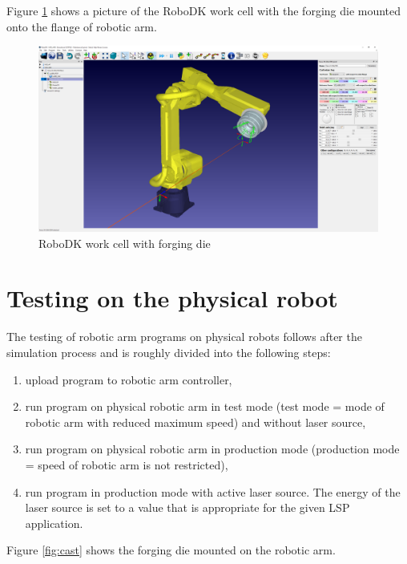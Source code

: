 Figure \ref{fig:robodk_die} shows a picture of the RoboDK work cell with the forging die mounted onto the flange of robotic arm.

\begin{figure}[h]
    \centering
    \includegraphics[width=1.0\linewidth]{img/robodk_cast.PNG}
    \caption{RoboDK work cell with forging die}
    \label{fig:robodk_die}
\end{figure}


\section{Testing on the physical robot}

The testing of robotic arm programs on physical robots follows after the simulation process and is roughly divided into the following steps:

\begin{enumerate}
    
\item upload program to robotic arm controller,

\item run program on physical robotic arm in test mode (test mode = mode of robotic arm with reduced maximum speed) and without laser source,

\item run program on physical robotic arm in production mode (production mode = speed of robotic arm is not restricted),

\item run program in production mode with active laser source. The energy of the laser source is set to a value that is appropriate for the given LSP application. 

\end{enumerate}

Figure \ref{fig:cast} shows the forging die mounted on the robotic arm.

